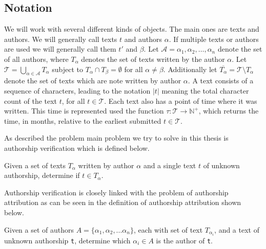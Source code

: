 \subsection{Notation}

We will work with several different kinds of objects. The main ones are
texts and authors. We will generally call texts $t$ and authors $\alpha$.
If multiple texts or authors are used we will generally call them $t'$ and
$\beta$. Let $\mathcal{A} = {\alpha_1, \alpha_2, \dots, \alpha_n}$ denote the
set of all authors, where $T_\alpha$ denotes the set of texts written by the
author $\alpha$. Let $\mathcal{T} = \bigcup_{\alpha \in \mathcal{A}} T_\alpha$
subject to $T_{\alpha} \cap T_\beta = \emptyset$ for all $\alpha \neq \beta$.
Additionally let $\overline{T_\alpha} = \mathcal{T} \setminus T_\alpha$ denote
the set of texts which are note written by author $\alpha$. A text consists
of a sequence of characters, leading to the notation $|t|$ meaning the total
character count of the text $t$, for all $t \in \mathcal{T}$. Each text also has
a point of time where it was written. This time is represented used the function
$\tau \colon \mathcal{T} \rightarrow \mathbb{N}^+$, which returns the time, in
months, relative to the earliest submitted $t \in \mathcal{T}$.


As described the problem main problem we try to solve in this thesis is
authorship verification which is defined below.

\begin{definition}
    \label{def:authorship_verification}

    Given a set of texts $T_\alpha$ written by author $\alpha$ and a single
    text $t$ of unknown authorship, determine if $t \in T_\alpha$.

\end{definition}

Authorship verification is closely linked with the problem of authorship
attribution as can be seen in the definition of authorship attribution shown
below.

\begin{definition}

    Given a set of authors $A = \{\alpha_1, \alpha_2,...\alpha_n\}$, each with
    set of text $T_{\alpha_i}$, and a text of unknown authorship \texttt{t},
    determine which $\alpha_i \in A$ is the author of \texttt{t}.

\end{definition}

